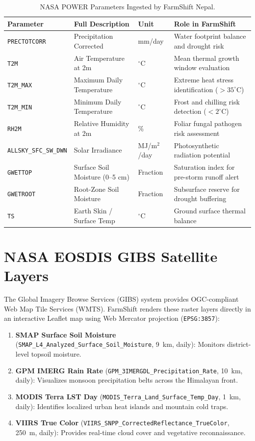 \documentclass[11pt,a4paper]{report}
\begin{document}
\begin{table}[htbp]
\centering
\small
\caption{NASA POWER Parameters Ingested by FarmShift Nepal.}
\label{tab:nasapower}
\begin{tabularx}{\textwidth}{lllX}
\toprule
\textbf{Parameter} & \textbf{Full Description} & \textbf{Unit} & \textbf{Role in FarmShift} \\
\midrule
\texttt{PRECTOTCORR} & Precipitation Corrected & mm/day & Water footprint balance and drought risk \\
\texttt{T2M} & Air Temperature at 2m & $^\circ$C & Mean thermal growth window evaluation \\
\texttt{T2M\_MAX} & Maximum Daily Temperature & $^\circ$C & Extreme heat stress identification ($>35^\circ$C) \\
\texttt{T2M\_MIN} & Minimum Daily Temperature & $^\circ$C & Frost and chilling risk detection ($<2^\circ$C) \\
\texttt{RH2M} & Relative Humidity at 2m & \% & Foliar fungal pathogen risk assessment \\
\texttt{ALLSKY\_SFC\_SW\_DWN} & Solar Irradiance & MJ/m$^2$/day & Photosynthetic radiation potential \\
\texttt{GWETTOP} & Surface Soil Moisture (0--5 cm) & Fraction & Saturation index for pre-storm runoff alert \\
\texttt{GWETROOT} & Root-Zone Soil Moisture & Fraction & Subsurface reserve for drought buffering \\
\texttt{TS} & Earth Skin / Surface Temp & $^\circ$C & Ground surface thermal balance \\
\bottomrule
\end{tabularx}
\end{table}

\section{NASA EOSDIS GIBS Satellite Layers}
The Global Imagery Browse Services (GIBS) system provides OGC-compliant Web Map Tile Services (WMTS). FarmShift renders these raster layers directly in an interactive Leaflet map using Web Mercator projection (\texttt{EPSG:3857}):
\begin{enumerate}
  \item \textbf{SMAP Surface Soil Moisture} (\texttt{SMAP\_L4\_Analyzed\_Surface\_Soil\_Moisture}, 9~km, daily): Monitors district-level topsoil moisture.
  \item \textbf{GPM IMERG Rain Rate} (\texttt{GPM\_3IMERGDL\_Precipitation\_Rate}, 10~km, daily): Visualizes monsoon precipitation belts across the Himalayan front.
  \item \textbf{MODIS Terra LST Day} (\texttt{MODIS\_Terra\_Land\_Surface\_Temp\_Day}, 1~km, daily): Identifies localized urban heat islands and mountain cold traps.
  \item \textbf{VIIRS True Color} (\texttt{VIIRS\_SNPP\_CorrectedReflectance\_TrueColor}, 250~m, daily): Provides real-time cloud cover and vegetative reconnaissance.
\end{enumerate}
\end{document}
